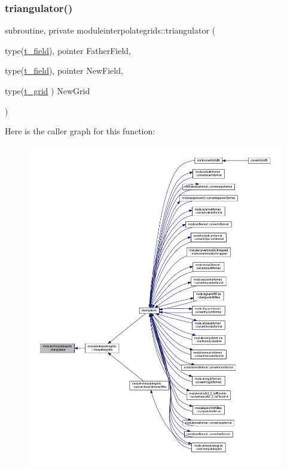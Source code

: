 \subsubsection{\texorpdfstring{triangulator()}{triangulator()}}
{\footnotesize\ttfamily subroutine, private moduleinterpolategrids\+::triangulator (\begin{DoxyParamCaption}\item[{type(\mbox{\hyperlink{structmoduleinterpolategrids_1_1t__field}{t\+\_\+field}}), pointer}]{Father\+Field,  }\item[{type(\mbox{\hyperlink{structmoduleinterpolategrids_1_1t__field}{t\+\_\+field}}), pointer}]{New\+Field,  }\item[{type(\mbox{\hyperlink{structmoduleinterpolategrids_1_1t__grid}{t\+\_\+grid}} )}]{New\+Grid }\end{DoxyParamCaption})\hspace{0.3cm}{\ttfamily [private]}}

Here is the caller graph for this function\+:\nopagebreak
\begin{figure}[H]
\begin{center}
\leavevmode
\includegraphics[width=350pt]{namespacemoduleinterpolategrids_aab05b158a6c1a5ca9b834b44a96bed51_icgraph}
\end{center}
\end{figure}
\mbox{\label{namespacemoduleinterpolategrids_ad4787724d5952f571795f2c775d76d32}} 

